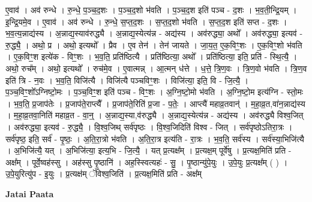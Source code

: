 \documentclass[17pt]{extarticle}
\begin{document}
ए॒वाव॑ । अव॑ रुन्धे । रु॒न्धे॒ प॒ञ्च॒द॒शः । प॒ञ्च॒द॒शो भ॑वति । प॒ञ्च॒द॒श इति॑ पञ्च - द॒शः । भ॒व॒ती॒न्द्रि॒यम् । इ॒न्द्रि॒यमे॒व । ए॒वाव॑ । अव॑ रुन्धे । रु॒न्धे॒ स॒प्त॒द॒शः । स॒प्त॒द॒शो भ॑वति । स॒प्त॒द॒श इति॑ सप्त - द॒शः । भ॒व॒त्य॒न्नाद्य॑स्य । अ॒न्नाद्य॒स्याव॑रुद्ध्यै । अ॒न्नाद्य॒स्येत्य॑न्न - अद्य॑स्य । अव॑रुद्ध्या॒ अथो᳚ । अव॑रुद्ध्या॒ इत्यव॑ - रु॒द्ध्यै॒ । अथो॒ प्र । अथो॒ इत्यथो᳚ । प्रैव । ए॒व तेन॑ । तेन॑ जायते । जा॒य॒त॒ ए॒क॒विꣳ॒॒शः । ए॒क॒विꣳ॒॒शो भ॑वति । ए॒क॒विꣳ॒॒श इत्ये॑क - विꣳ॒॒शः । भ॒व॒ति॒ प्रति॑ष्ठित्यै । प्रति॑ष्ठित्या॒ अथो᳚ । प्रति॑ष्ठित्या॒ इति॒ प्रति॑ - स्थि॒त्यै॒ । अथो॒ रुच᳚म् । अथो॒ इत्यथो᳚ । रुच॑मे॒व । ए॒वात्मन्न् । आ॒त्मन् ध॑त्ते । ध॒त्ते॒ त्रि॒ण॒वः । त्रि॒ण॒वो भ॑वति । त्रि॒ण॒व इति॑ त्रि - न॒वः । भ॒व॒ति॒ विजि॑त्यै । विजि॑त्यै पञ्चविꣳ॒॒शः । विजि॑त्या॒ इति॒ वि - जि॒त्यै॒ । प॒ञ्च॒विꣳ॒॒शो᳚ऽग्निष्टो॒मः । प॒ञ्च॒विꣳ॒॒श इति॑ पञ्च - विꣳ॒॒शः । अ॒ग्नि॒ष्टो॒मो भ॑वति । अ॒ग्नि॒ष्टो॒म इत्य॑ग्नि - स्तो॒मः । भ॒व॒ति॒ प्र॒जाप॑तेः । प्र॒जाप॑ते॒राप्त्यै᳚ । प्र॒जाप॑ते॒रिति॑ प्र॒जा - प॒तेः॒ । आप्त्यै॑ महाव्र॒तवान्॑ । म॒हा॒व्र॒त,वा॑न॒न्नाद्य॑स्य । म॒हा॒व्र॒तवा॒निति॑ महाव्र॒त - वा॒न्॒ । अ॒न्नाद्य॒स्या,व॑रुद्ध्यै । अ॒न्नाद्य॒स्येत्य॑न्न - अद्य॑स्य । अव॑रुद्ध्यै विश्व॒जित् । अव॑रुद्ध्या॒ इत्यव॑ - रु॒द्ध्यै॒ । वि॒श्व॒जिथ् सर्व॑पृष्ठः । वि॒श्व॒जिदिति॑ विश्व - जित् । सर्व॑पृष्ठोऽतिरा॒त्रः । सर्व॑पृष्ठ॒ इति॒ सर्व॑ - पृ॒ष्ठः॒ । अ॒ति॒रा॒त्रो भ॑वति । अ॒ति॒रा॒त्र इत्य॑ति - रा॒त्रः । भ॒व॒ति॒ सर्व॑स्य । सर्व॑स्या॒भिजि॑त्यै । अ॒भिजि॑त्यै॒ यत् । अ॒भिजि॑त्या॒ इत्य॒भि - जि॒त्यै॒ । यत् प्र॒त्यक्ष᳚म् । प्र॒त्यक्ष॒म् पूर्वे॑षु । प्र॒त्यक्ष॒मिति॑ प्रति - अक्ष᳚म् । पूर्वे॒ष्वह॑स्सु । अह॑स्सु पृ॒ष्ठानि॑ । अह॒स्स्वित्यहः॑ - सु॒ । पृ॒ष्ठान्यु॑पे॒युः । उ॒पे॒युः प्र॒त्यक्ष᳚म् ( ) । उ॒पे॒युरित्यु॑प - इ॒युः । प्र॒त्यक्ष॑म् ॅविश्व॒जिति॑ । प्र॒त्यक्ष॒मिति॑ प्रति - अक्ष᳚म् \newline

\textbf{Jatai Paata} \newline
\end{document}

